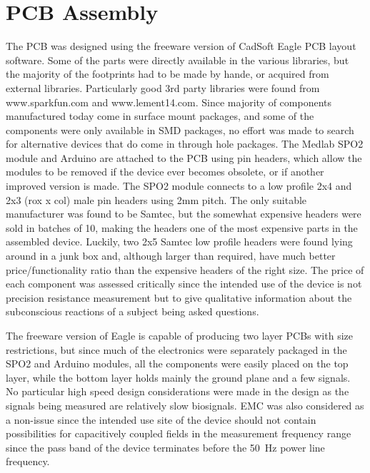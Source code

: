 \documentclass[a4paper,11pt]{article}
\begin{document}
\section{PCB Assembly}
The PCB was designed using the freeware version of CadSoft Eagle PCB
layout software. Some of the parts were directly available in the
various libraries, but the majority of the footprints had to be made
by hande, or acquired from external libraries. Particularly good 3rd
party libraries were found from www.sparkfun.com and www.lement14.com.
Since majority of components manufactured today come in surface mount
packages, and some of the components were only available in SMD
packages, no effort was made to search for alternative devices that do
come in through hole packages. The Medlab SPO2 module and Arduino are
attached to the PCB using pin headers, which allow the modules to be
removed if the device ever becomes obsolete, or if another improved
version is made. The SPO2 module connects to a low profile 2x4 and 2x3
(rox x col) male pin headers using 2mm pitch. The only suitable
manufacturer was found to be Samtec, but the somewhat expensive
headers were sold in batches of 10, making the headers one of the most
expensive parts in the assembled device. Luckily, two 2x5 Samtec low
profile headers were found lying around in a junk box and, although
larger than required, have much better price/functionality ratio than
the expensive headers of the right size. The price of each component
was assessed critically since the intended use of the device is not
precision resistance measurement but to give qualitative information
about the subconscious reactions of a subject being asked questions.

The freeware version of Eagle is capable of producing two layer PCBs
with size restrictions, but since much of the electronics were
separately packaged in the SPO2 and Arduino modules, all the
components were easily placed on the top layer, while the bottom layer
holds mainly the ground plane and a few signals. No particular high
speed design considerations were made in the design as the signals
being measured are relatively slow biosignals. EMC was also considered
as a non-issue since the intended use site of the device should not
contain possibilities for capacitively coupled fields in the
measurement frequency range since the pass band of the device
terminates before the \SI{50}{\hertz} power line frequency.
\end{document}
